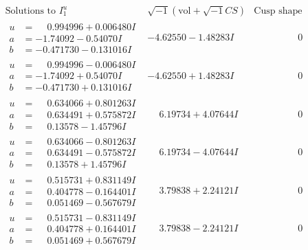 \documentclass[1p]{elsarticle_modified}
\theoremstyle{definition}
\newcommand{\I}{\sqrt{-1}}
\begin{document}
$$\begin{array}{c|c|c}  
\text{Solutions to }I^u_{1}& \I (\text{vol} + \sqrt{-1}CS) & \text{Cusp shape}\\
 \hline 
\begin{aligned}
u &= \phantom{-}0.994996 + 0.006480 I \\
a &= -1.74092 - 0.54070 I \\
b &= -0.471730 - 0.131016 I\end{aligned}
 & -4.62550 - 1.48283 I & \phantom{-0.000000 } 0 \\ \hline\begin{aligned}
u &= \phantom{-}0.994996 - 0.006480 I \\
a &= -1.74092 + 0.54070 I \\
b &= -0.471730 + 0.131016 I\end{aligned}
 & -4.62550 + 1.48283 I & \phantom{-0.000000 } 0 \\ \hline\begin{aligned}
u &= \phantom{-}0.634066 + 0.801263 I \\
a &= \phantom{-}0.634491 + 0.575872 I \\
b &= \phantom{-}0.13578 - 1.45796 I\end{aligned}
 & \phantom{-}6.19734 + 4.07644 I & \phantom{-0.000000 } 0 \\ \hline\begin{aligned}
u &= \phantom{-}0.634066 - 0.801263 I \\
a &= \phantom{-}0.634491 - 0.575872 I \\
b &= \phantom{-}0.13578 + 1.45796 I\end{aligned}
 & \phantom{-}6.19734 - 4.07644 I & \phantom{-0.000000 } 0 \\ \hline\begin{aligned}
u &= \phantom{-}0.515731 + 0.831149 I \\
a &= \phantom{-}0.404778 - 0.164401 I \\
b &= \phantom{-}0.051469 - 0.567679 I\end{aligned}
 & \phantom{-}3.79838 + 2.24121 I & \phantom{-0.000000 } 0 \\ \hline\begin{aligned}
u &= \phantom{-}0.515731 - 0.831149 I \\
a &= \phantom{-}0.404778 + 0.164401 I \\
b &= \phantom{-}0.051469 + 0.567679 I\end{aligned}
 & \phantom{-}3.79838 - 2.24121 I & \phantom{-0.000000 } 0 \\ \hline\begin{aligned}

\end{aligned}
\end{array}$$
\end{document}
